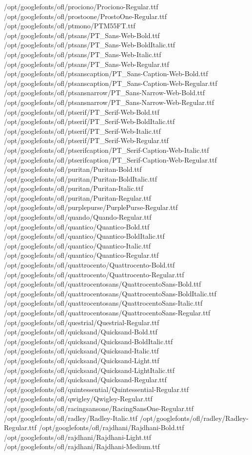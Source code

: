 /opt/googlefonts/ofl/prociono/Prociono-Regular.ttf
/opt/googlefonts/ofl/prostoone/ProstoOne-Regular.ttf
/opt/googlefonts/ofl/ptmono/PTM55FT.ttf
/opt/googlefonts/ofl/ptsans/PT_Sans-Web-Bold.ttf
/opt/googlefonts/ofl/ptsans/PT_Sans-Web-BoldItalic.ttf
/opt/googlefonts/ofl/ptsans/PT_Sans-Web-Italic.ttf
/opt/googlefonts/ofl/ptsans/PT_Sans-Web-Regular.ttf
/opt/googlefonts/ofl/ptsanscaption/PT_Sans-Caption-Web-Bold.ttf
/opt/googlefonts/ofl/ptsanscaption/PT_Sans-Caption-Web-Regular.ttf
/opt/googlefonts/ofl/ptsansnarrow/PT_Sans-Narrow-Web-Bold.ttf
/opt/googlefonts/ofl/ptsansnarrow/PT_Sans-Narrow-Web-Regular.ttf
/opt/googlefonts/ofl/ptserif/PT_Serif-Web-Bold.ttf
/opt/googlefonts/ofl/ptserif/PT_Serif-Web-BoldItalic.ttf
/opt/googlefonts/ofl/ptserif/PT_Serif-Web-Italic.ttf
/opt/googlefonts/ofl/ptserif/PT_Serif-Web-Regular.ttf
/opt/googlefonts/ofl/ptserifcaption/PT_Serif-Caption-Web-Italic.ttf
/opt/googlefonts/ofl/ptserifcaption/PT_Serif-Caption-Web-Regular.ttf
/opt/googlefonts/ofl/puritan/Puritan-Bold.ttf
/opt/googlefonts/ofl/puritan/Puritan-BoldItalic.ttf
/opt/googlefonts/ofl/puritan/Puritan-Italic.ttf
/opt/googlefonts/ofl/puritan/Puritan-Regular.ttf
/opt/googlefonts/ofl/purplepurse/PurplePurse-Regular.ttf
/opt/googlefonts/ofl/quando/Quando-Regular.ttf
/opt/googlefonts/ofl/quantico/Quantico-Bold.ttf
/opt/googlefonts/ofl/quantico/Quantico-BoldItalic.ttf
/opt/googlefonts/ofl/quantico/Quantico-Italic.ttf
/opt/googlefonts/ofl/quantico/Quantico-Regular.ttf
/opt/googlefonts/ofl/quattrocento/Quattrocento-Bold.ttf
/opt/googlefonts/ofl/quattrocento/Quattrocento-Regular.ttf
/opt/googlefonts/ofl/quattrocentosans/QuattrocentoSans-Bold.ttf
/opt/googlefonts/ofl/quattrocentosans/QuattrocentoSans-BoldItalic.ttf
/opt/googlefonts/ofl/quattrocentosans/QuattrocentoSans-Italic.ttf
/opt/googlefonts/ofl/quattrocentosans/QuattrocentoSans-Regular.ttf
/opt/googlefonts/ofl/questrial/Questrial-Regular.ttf
/opt/googlefonts/ofl/quicksand/Quicksand-Bold.ttf
/opt/googlefonts/ofl/quicksand/Quicksand-BoldItalic.ttf
/opt/googlefonts/ofl/quicksand/Quicksand-Italic.ttf
/opt/googlefonts/ofl/quicksand/Quicksand-Light.ttf
/opt/googlefonts/ofl/quicksand/Quicksand-LightItalic.ttf
/opt/googlefonts/ofl/quicksand/Quicksand-Regular.ttf
/opt/googlefonts/ofl/quintessential/Quintessential-Regular.ttf
/opt/googlefonts/ofl/qwigley/Qwigley-Regular.ttf
/opt/googlefonts/ofl/racingsansone/RacingSansOne-Regular.ttf
/opt/googlefonts/ofl/radley/Radley-Italic.ttf
/opt/googlefonts/ofl/radley/Radley-Regular.ttf
/opt/googlefonts/ofl/rajdhani/Rajdhani-Bold.ttf
/opt/googlefonts/ofl/rajdhani/Rajdhani-Light.ttf
/opt/googlefonts/ofl/rajdhani/Rajdhani-Medium.ttf
